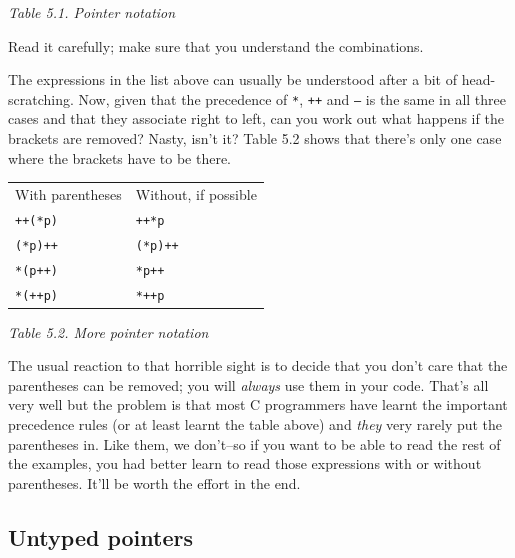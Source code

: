 \begin{center}\textit{Table 5.1. Pointer notation}\end{center}


   Read it carefully; make sure that you understand the combinations.


   The expressions in the list above can usually be understood after
    a bit of head-scratching. Now, given that the precedence of
    \texttt{*}, \texttt{++} and \texttt{--} is the same in all
    three cases and that they associate right to left, can you work out what
    happens if the brackets are removed? Nasty, isn't it? Table 5.2 shows that there's only one case where the brackets have to
    be there.


   \begin{tabular}{lp{\textwidth}}
     With parentheses & Without, if possible
    \\

     \texttt{++(*p)} & \texttt{++*p}
    \\

     \texttt{(*p)++} & \texttt{(*p)++}
    \\

     \texttt{*(p++)} & \texttt{*p++}
    \\

     \texttt{*(++p)} & \texttt{*++p}
    \\
\end{tabular}

\begin{center}\textit{Table 5.2. More pointer notation}\end{center}


   The usual reaction to that horrible sight is to decide that you don't
    care that the parentheses can be removed; you will \textit{always} use
    them in your code. That's all very well but the problem is that most
    C programmers have learnt the important precedence rules (or at least
    learnt the table above) and \textit{they} very rarely put the
    parentheses in. Like them, we don't--so if you want to be able to
    read the rest of the examples, you had better learn to read those
    expressions with or without parentheses. It'll be worth the effort in
    the end.


  

  \subsection{Untyped pointers}
   

